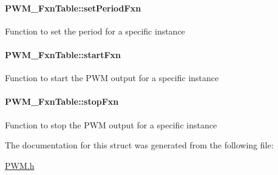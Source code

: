 \paragraph[{set\+Period\+Fxn}]{ P\+W\+M\+\_\+\+Fxn\+Table\+::set\+Period\+Fxn}\label{struct_p_w_m___fxn_table_a8c2294da9c53264f7096f6679316f950}
Function to set the period for a specific instance 
\paragraph[{start\+Fxn}]{ P\+W\+M\+\_\+\+Fxn\+Table\+::start\+Fxn}\label{struct_p_w_m___fxn_table_afd7e6ebdef185aac438ba871f6163fd5}
Function to start the P\+W\+M output for a specific instance 
\paragraph[{stop\+Fxn}]{ P\+W\+M\+\_\+\+Fxn\+Table\+::stop\+Fxn}\label{struct_p_w_m___fxn_table_a0614274c889e81ab19a24f2b076b17d3}
Function to stop the P\+W\+M output for a specific instance 

The documentation for this struct was generated from the following file\+:\begin{DoxyCompactItemize}
\item 
\hyperlink{_p_w_m_8h}{P\+W\+M.\+h}\end{DoxyCompactItemize}

